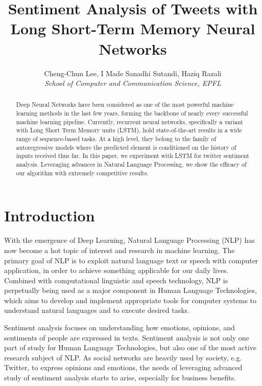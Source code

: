 \documentclass[10pt,conference,compsocconf]{IEEEtran}
\begin{document}
\title{Sentiment Analysis of Tweets with Long Short-Term Memory Neural Networks}

\author{
  Cheng-Chun Lee, I Made Sanadhi Sutandi, Haziq Razali\\
  \textit{School of Computer and Communication Science, EPFL}
}

\maketitle

\begin{abstract}
  Deep Neural Networks have been considered as one of the most powerful machine learning methods in the last few years, forming the backbone of nearly every successful machine learning pipeline. Currently, recurrent neural networks, specifically a variant with Long Short Term Memory units (LSTM), hold state-of-the-art results in a wide range of sequence-based tasks. At a high level, they belong to the family of autoregressive models where the predicted element is conditioned on the history of inputs received thus far. In this paper, we experiment with LSTM for twitter sentiment analysis. Leveraging advances in Natural Language Processing, we show the efficacy of our algorithm with extremely competitive results.
\end{abstract}

\section{Introduction}
With the emergence of Deep Learning, Natural Language Processing (NLP) has now become a hot topic of interest and research in machine learning. The primary goal of NLP is to exploit natural language text or speech with computer application, in order to achieve something applicable for our daily lives. Combined with computational linguistic and speech technology, NLP is perpetually being used as a major component in Human Language Technologies, which aims to develop and implement appropriate tools for computer systems to understand natural languages and to execute desired tasks.

Sentiment analysis focuses on understanding how emotions, opinions, and sentiments of people are expressed in texts. Sentiment analysis is not only one part of study for Human Language Technologies, but also one of the most active research subject of NLP.  As social networks are heavily used by society, e.g. Twitter, to express opinions and emotions, the needs of leveraging advanced study of sentiment analysis starts to arise, especially for business benefits\cite{opinion_mining}.
\end{document}
